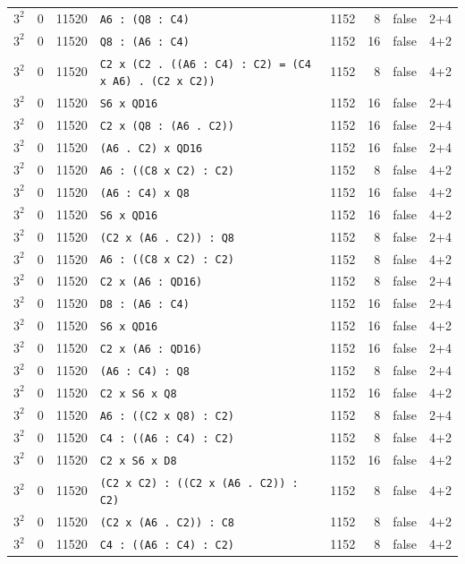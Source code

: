 \begin{longtable}{llrlrrll}
$3^2$ & 0 & 11520 & \texttt{A6 : (Q8 : C4)} & 1152 & 8 & false & 2+4\\
$3^2$ & 0 & 11520 & \texttt{Q8 : (A6 : C4)} & 1152 & 16 & false & 4+2\\
$3^2$ & 0 & 11520 & \texttt{C2 x (C2 . ((A6 : C4) : C2) = (C4 x A6) . (C2 x C2))} & 1152 & 8 & false & 4+2\\
$3^2$ & 0 & 11520 & \texttt{S6 x QD16} & 1152 & 16 & false & 2+4\\
$3^2$ & 0 & 11520 & \texttt{C2 x (Q8 : (A6 . C2))} & 1152 & 16 & false & 2+4\\
$3^2$ & 0 & 11520 & \texttt{(A6 . C2) x QD16} & 1152 & 16 & false & 2+4\\
$3^2$ & 0 & 11520 & \texttt{A6 : ((C8 x C2) : C2)} & 1152 & 8 & false & 4+2\\
$3^2$ & 0 & 11520 & \texttt{(A6 : C4) x Q8} & 1152 & 16 & false & 4+2\\
$3^2$ & 0 & 11520 & \texttt{S6 x QD16} & 1152 & 16 & false & 4+2\\
$3^2$ & 0 & 11520 & \texttt{(C2 x (A6 . C2)) : Q8} & 1152 & 8 & false & 2+4\\
$3^2$ & 0 & 11520 & \texttt{A6 : ((C8 x C2) : C2)} & 1152 & 8 & false & 4+2\\
$3^2$ & 0 & 11520 & \texttt{C2 x (A6 : QD16)} & 1152 & 8 & false & 2+4\\
$3^2$ & 0 & 11520 & \texttt{D8 : (A6 : C4)} & 1152 & 16 & false & 2+4\\
$3^2$ & 0 & 11520 & \texttt{S6 x QD16} & 1152 & 16 & false & 4+2\\
$3^2$ & 0 & 11520 & \texttt{C2 x (A6 : QD16)} & 1152 & 16 & false & 2+4\\
$3^2$ & 0 & 11520 & \texttt{(A6 : C4) : Q8} & 1152 & 8 & false & 2+4\\
$3^2$ & 0 & 11520 & \texttt{C2 x S6 x Q8} & 1152 & 16 & false & 4+2\\
$3^2$ & 0 & 11520 & \texttt{A6 : ((C2 x Q8) : C2)} & 1152 & 8 & false & 2+4\\
$3^2$ & 0 & 11520 & \texttt{C4 : ((A6 : C4) : C2)} & 1152 & 8 & false & 4+2\\
$3^2$ & 0 & 11520 & \texttt{C2 x S6 x D8} & 1152 & 16 & false & 4+2\\
$3^2$ & 0 & 11520 & \texttt{(C2 x C2) : ((C2 x (A6 . C2)) : C2)} & 1152 & 8 & false & 4+2\\
$3^2$ & 0 & 11520 & \texttt{(C2 x (A6 . C2)) : C8} & 1152 & 8 & false & 4+2\\
$3^2$ & 0 & 11520 & \texttt{C4 : ((A6 : C4) : C2)} & 1152 & 8 & false & 4+2\\

\end{longtable}
